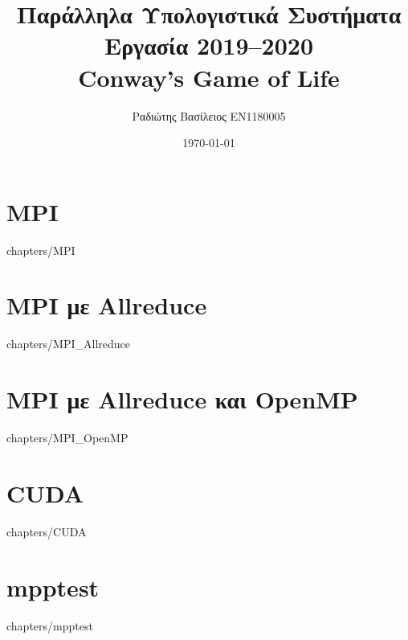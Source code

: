 \documentclass[a4paper,twoside,12pt]{report}
\title {Παράλληλα Υπολογιστικά Συστήματα\\Εργασία 2019--2020\\Conway’s Game of Life}
\author {Ραδιώτης Βασίλειος EN1180005}
\date {\today}
\begin{document}
\maketitle

\tableofcontents{}

\chapter {MPI}
     {chapters/MPI}

\chapter {MPI με Allreduce}
     {chapters/MPI_Allreduce}

\chapter {MPI με Allreduce και OpenMP}
     {chapters/MPI_OpenMP}

\chapter {CUDA}
     {chapters/CUDA}

\chapter {mpptest}
     {chapters/mpptest}
\end{document}
